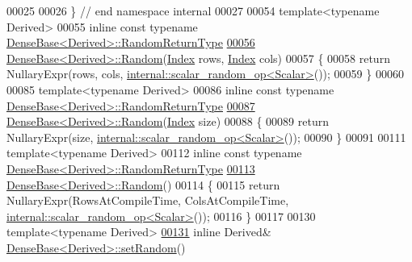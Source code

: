 \begin{DoxyCode}
00025 
00026 \} \textcolor{comment}{// end namespace internal}
00027 
00054 \textcolor{keyword}{template}<\textcolor{keyword}{typename} Derived>
00055 \textcolor{keyword}{inline} \textcolor{keyword}{const} \textcolor{keyword}{typename} \hyperlink{group___core___module_class_eigen_1_1_cwise_nullary_op}{DenseBase<Derived>::RandomReturnType}
\hyperlink{group___core___module_ae97f8d9d08f969c733c8144be6225756}{00056} \hyperlink{group___core___module_ae814abb451b48ed872819192dc188c19}{DenseBase<Derived>::Random}(\hyperlink{namespace_eigen_a62e77e0933482dafde8fe197d9a2cfde}{Index} rows, \hyperlink{namespace_eigen_a62e77e0933482dafde8fe197d9a2cfde}{Index} cols)
00057 \{
00058   \textcolor{keywordflow}{return} NullaryExpr(rows, cols, \hyperlink{struct_eigen_1_1internal_1_1scalar__random__op}{internal::scalar\_random\_op<Scalar>}());
00059 \}
00060 
00085 \textcolor{keyword}{template}<\textcolor{keyword}{typename} Derived>
00086 \textcolor{keyword}{inline} \textcolor{keyword}{const} \textcolor{keyword}{typename} \hyperlink{group___core___module_class_eigen_1_1_cwise_nullary_op}{DenseBase<Derived>::RandomReturnType}
\hyperlink{group___core___module_a7eb5f974a8f0b67eac7080db1da0e308}{00087} \hyperlink{group___core___module_ae814abb451b48ed872819192dc188c19}{DenseBase<Derived>::Random}(\hyperlink{namespace_eigen_a62e77e0933482dafde8fe197d9a2cfde}{Index} size)
00088 \{
00089   \textcolor{keywordflow}{return} NullaryExpr(size, \hyperlink{struct_eigen_1_1internal_1_1scalar__random__op}{internal::scalar\_random\_op<Scalar>}());
00090 \}
00091 
00111 \textcolor{keyword}{template}<\textcolor{keyword}{typename} Derived>
00112 \textcolor{keyword}{inline} \textcolor{keyword}{const} \textcolor{keyword}{typename} \hyperlink{group___core___module_class_eigen_1_1_cwise_nullary_op}{DenseBase<Derived>::RandomReturnType}
\hyperlink{group___core___module_ae814abb451b48ed872819192dc188c19}{00113} \hyperlink{group___core___module_ae814abb451b48ed872819192dc188c19}{DenseBase<Derived>::Random}()
00114 \{
00115   \textcolor{keywordflow}{return} NullaryExpr(RowsAtCompileTime, ColsAtCompileTime, 
      \hyperlink{struct_eigen_1_1internal_1_1scalar__random__op}{internal::scalar\_random\_op<Scalar>}());
00116 \}
00117 
00130 \textcolor{keyword}{template}<\textcolor{keyword}{typename} Derived>
\hyperlink{group___core___module_ac476e5852129ba32beaa1a8a3d7ee0db}{00131} \textcolor{keyword}{inline} Derived& \hyperlink{group___core___module_ac476e5852129ba32beaa1a8a3d7ee0db}{DenseBase<Derived>::setRandom}()

\end{DoxyCode}
